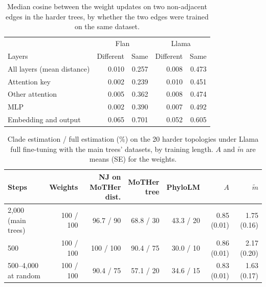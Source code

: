 \documentclass{article}
\theoremstyle{definition}
\theoremstyle{plain}
\newif\ifrevision
\newcommand{\rev}[1]{\ifrevision{\color{blue}#1}\else#1\fi}
\newcommand{\revcolor}{\ifrevision\color{blue}\fi}
\newcommand{\revtag}[1]{\ifrevision\textsuperscript{\color{blue}\sffamily\scriptsize[#1]}\fi}
\begin{document}
\begin{table}[h]
{\revcolor
\caption{\rev{Median cosine between the weight updates on two non-adjacent edges in the harder trees, by whether the two edges were trained on the same dataset.}\revtag{S8sV Q3}}
\label{tab:edgecos}
\centering
\small
\begin{tabular}{lrrrr}
\toprule
 & \multicolumn{2}{c}{Flan} & \multicolumn{2}{c}{Llama} \\
\cmidrule(lr){2-3}\cmidrule(lr){4-5}
Layers & Different & Same & Different & Same \\
\midrule
All layers (mean distance) & 0.010 & 0.257 & 0.008 & 0.473 \\
Attention key & 0.002 & 0.239 & 0.010 & 0.451 \\
Other attention & 0.005 & 0.362 & 0.008 & 0.474 \\
MLP & 0.002 & 0.390 & 0.007 & 0.492 \\
Embedding and output & 0.065 & 0.701 & 0.052 & 0.605 \\
\bottomrule
\end{tabular}\par
}
\end{table}

\begin{table}[h]
{\revcolor
\caption{\rev{Clade estimation / full estimation (\%) on the 20 harder topologies under Llama full fine-tuning with the main trees' datasets, by training length. $A$ and $\widetilde m$ are means (SE) for the weights.}\revtag{S8sV Q2; tWEn W2}}
\label{tab:length}
\centering
\small
\setlength{\tabcolsep}{4pt}
\begin{tabular}{lrrrrrr}
\toprule
Steps & Weights & \shortstack{NJ on\\MoTHer dist.} & \shortstack{MoTHer\\tree} & PhyloLM & $A$ & $\widetilde m$ \\
\midrule
2,000 (main trees) & 100 / 100 & 96.7 / 90 & 68.8 / 30 & 43.3 / 20 & 0.85 (0.01) & 1.75 (0.16) \\
500 & 100 / 100 & 100 / 100 & 90.4 / 75 & 30.0 / 10 & 0.86 (0.01) & 2.17 (0.20) \\
500--4,000 at random & 100 / 100 & 90.4 / 75 & 57.1 / 20 & 34.6 / 15 & 0.83 (0.01) & 1.63 (0.17) \\
\bottomrule
\end{tabular}\par
}
\end{table}
\end{document}
